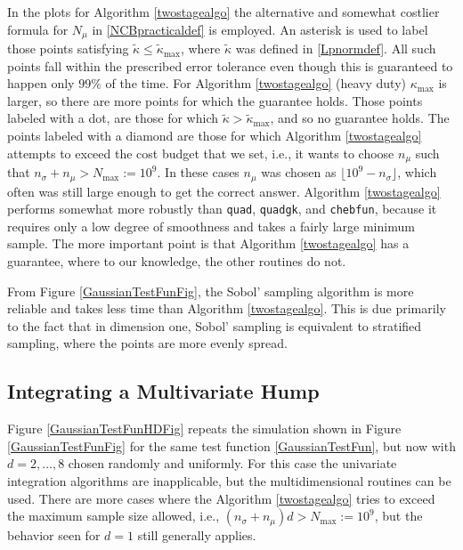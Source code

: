 \documentclass[graybox]{svmult}
\newcommand{\tkappa}{\tilde{\kappa}}
\begin{document}
In the plots for Algorithm \ref{twostagealgo} the alternative and somewhat costlier formula for $N_{\mu}$ in \eqref{NCBpracticaldef} is employed. An asterisk is used to label those points satisfying $\tkappa \le \tkappa_{\max}$, where $\tkappa$ was defined in \eqref{Lpnormdef}. All such points fall within the prescribed error tolerance even though this is guaranteed to happen only $99\%$ of the time.  For Algorithm \ref{twostagealgo} (heavy duty) $\kappa_{\max}$ is larger, so there are more points for which the guarantee holds.  Those points labeled with a dot, are those for which $\tkappa > \tkappa_{\max}$, and so no guarantee holds. The points labeled with a diamond are those for which Algorithm \ref{twostagealgo} attempts to exceed the cost budget that we set, i.e., it wants to choose $n_\mu$ such that $n_{\sigma}+n_\mu > N_{\max}:=10^9$. In these cases $n_\mu$ was chosen as $\lfloor 10^9 - n_\sigma \rfloor$, which often was still large enough to get the correct answer.  Algorithm \ref{twostagealgo} performs somewhat more robustly than {\tt quad}, {\tt quadgk}, and {\tt chebfun}, because it requires only a low degree of smoothness and takes a fairly large minimum sample. The more important point is that Algorithm \ref{twostagealgo} has a guarantee, where to our knowledge, the other routines do not.

From Figure \ref{GaussianTestFunFig}, the Sobol' sampling algorithm is more reliable and takes less time than Algorithm \ref{twostagealgo}.  This is due primarily to the fact that in dimension one, Sobol' sampling is equivalent to stratified sampling, where the points are more evenly spread.

\subsection{Integrating a Multivariate Hump}

Figure \ref{GaussianTestFunHDFig} repeats the simulation shown in Figure \ref{GaussianTestFunFig} for the same test function \eqref{GaussianTestFun}, but now with $d=2, \ldots, 8$ chosen randomly and uniformly.  For this case the univariate integration algorithms are inapplicable, but the multidimensional routines can be used.  There are more cases where the Algorithm \ref{twostagealgo} tries to exceed the maximum sample size allowed, i.e., $(n_{\sigma}+n_\mu)d > N_{\max}:=10^9$, but the behavior seen for $d=1$ still generally applies.  
\end{document}
